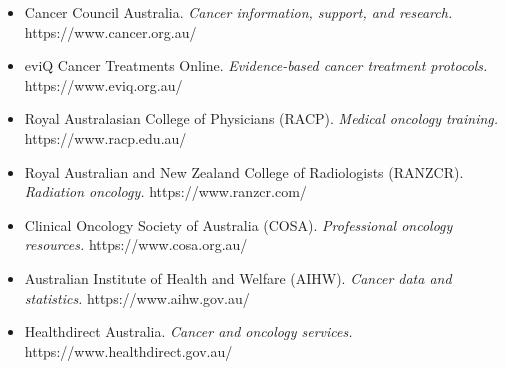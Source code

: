 \begin{itemize}
    \item Cancer Council Australia. \textit{Cancer information, support, and research.} https://www.cancer.org.au/
    \item eviQ Cancer Treatments Online. \textit{Evidence-based cancer treatment protocols.} https://www.eviq.org.au/
    \item Royal Australasian College of Physicians (RACP). \textit{Medical oncology training.} https://www.racp.edu.au/
    \item Royal Australian and New Zealand College of Radiologists (RANZCR). \textit{Radiation oncology.} https://www.ranzcr.com/
    \item Clinical Oncology Society of Australia (COSA). \textit{Professional oncology resources.} https://www.cosa.org.au/
    \item Australian Institute of Health and Welfare (AIHW). \textit{Cancer data and statistics.} https://www.aihw.gov.au/
    \item Healthdirect Australia. \textit{Cancer and oncology services.} https://www.healthdirect.gov.au/
\end{itemize}

\clearpage
